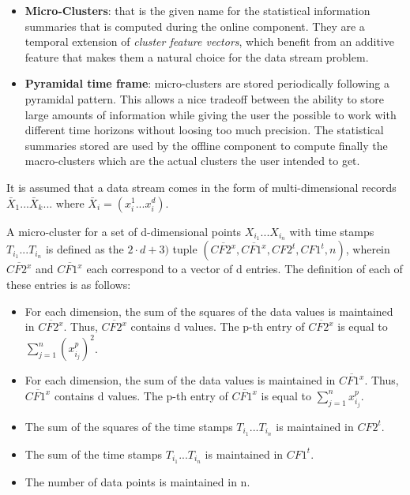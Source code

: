 \begin{itemize}
 \item \textbf{Micro-Clusters}: that is the given name for the statistical information summaries that is computed during the online component. They are a temporal extension of \textit{cluster feature vectors}\cite{zhang96birch}, which benefit from an additive feature that makes them a natural choice for the data stream problem\cite{clustreamOrig}.
 
 \item \textbf{Pyramidal time frame}: micro-clusters are stored periodically following a pyramidal pattern. This allows a nice tradeoff between the ability to store large amounts of information while giving the user the possible to work with different time horizons without loosing too much precision. The statistical summaries stored are used by the offline component to compute finally the macro-clusters which are the actual clusters the user intended to get.
\end{itemize}

It is assumed that a data stream comes in the form of multi-dimensional records $\bar X_1 ... \bar X_k ...$ where $\bar X_i = (x^1_i ... x^d_i)$.

\begin{definition}\cite{clustreamOrig}

A micro-cluster for a set of d-dimensional points $X_{i_1} ...X_{i_n}$ with time stamps
$T_{i_1} ...T_{i_n}$ is defined as the $2 \cdot d + 3)$ tuple $(\overline{CF2^x},\overline{CF1^x},CF2^t,CF1^t,n)$, wherein $\overline{CF2^x}$ and $\overline{CF1^x}$ each correspond to a vector of d entries. The definition of each of these entries is as follows: 

\begin{itemize}
 \item For each dimension, the sum of the squares of the data values is maintained in $\overline{CF2^x}$. Thus, $\overline{CF2^x}$ contains d values. The p-th entry of $\overline{CF2^x}$ is equal to $\sum^n_{j=1} (x^p_{i_j})^2$. 
 \item For each dimension, the sum of the data values is maintained in $\overline{CF1^x}$. Thus, $\overline{CF1^x}$ contains d values. The p-th entry of $\overline{CF1^x}$ is equal to $\sum^n_{j=1} x^p_{i_j}$.
 \item The sum of the squares of the time stamps $T_{i_1} ...T_{i_n}$ is maintained in $CF2^t$.
 \item The sum of the time stamps $T_{i_1} ...T_{i_n}$ is maintained in $CF1^t$.
 \item The number of data points is maintained in n.
\end{itemize}

\end{definition}

